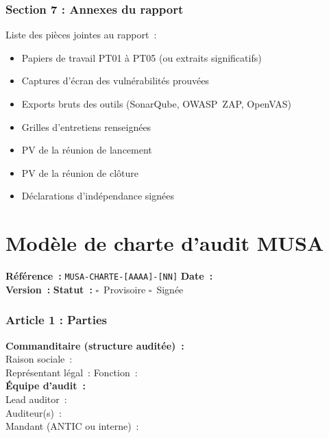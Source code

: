 \documentclass[12pt,a4paper,oneside]{report}
\begin{document}
\subsection*{Section 7 : Annexes du rapport}

\begin{encadre}
Liste des pi\`eces jointes au rapport~:
\begin{itemize}[label={\color{gold}}, leftmargin=*]
\item Papiers de travail PT01 \`a PT05 (ou extraits significatifs)
\item Captures d'\'ecran des vuln\'erabilit\'es prouv\'ees
\item Exports bruts des outils (SonarQube, OWASP~ZAP, OpenVAS)
\item Grilles d'entretiens renseign\'ees
\item PV de la r\'eunion de lancement
\item PV de la r\'eunion de cl\^oture
\item D\'eclarations d'ind\'ependance sign\'ees
\end{itemize}
\end{encadre}

\newpage

\chapter{Mod\`ele de charte d'audit MUSA}
\label{annexe:charte}

\begin{goldbox}[title={\color{navy}\bfseries CHARTE D'AUDIT DE S\'ECURIT\'E APPLICATIVE : MUSA}]
\small
\textbf{R\'ef\'erence~:} \texttt{MUSA-CHARTE-[AAAA]-[NN]} \quad \textbf{Date~:} \dotfill \\[6pt]
\textbf{Version~:} \dotfill \quad \textbf{Statut~:} $\square$~Provisoire \quad $\square$~Sign\'ee
\end{goldbox}

\subsection*{Article 1 : Parties}

\begin{encadre}
\textbf{Commanditaire (structure audit\'ee)~:}\\
Raison sociale~: \dotfill \\
Repr\'esentant l\'egal~: \dotfill \quad Fonction~: \dotfill \\[6pt]
\textbf{\'Equipe d'audit~:}\\
Lead auditor~: \dotfill \\
Auditeur(s)~: \dotfill \\
Mandant (ANTIC ou interne)~: \dotfill
\end{encadre}
\end{document}
